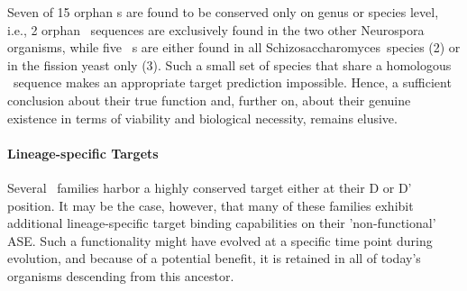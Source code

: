 Seven of 15 orphan \haca s are found to be conserved only on genus or
species level, i.e., 2 orphan \ncr\ sequences are exclusively found in the
two other Neurospora organisms, while five \spo\ \sno s are either found in
all Schizosaccharomyces\ species (2) or in the fission yeast only (3). Such
a small set of species that share a homologous \sno\ sequence makes an
appropriate target prediction impossible. Hence, a sufficient conclusion
about their true function and, further on, about their genuine existence in
terms of viability and biological necessity, remains elusive.

\paragraph{Lineage-specific Targets}
Several \cd\ families harbor a highly conserved target either at
their D or D' position. It may be the case, however, that many of
these families exhibit additional lineage-specific target binding
capabilities on their 'non-functional' ASE. Such a functionality might have
evolved at a specific time point during evolution, and because of a
potential benefit, it is retained in all of today's organisms descending
from this ancestor.

